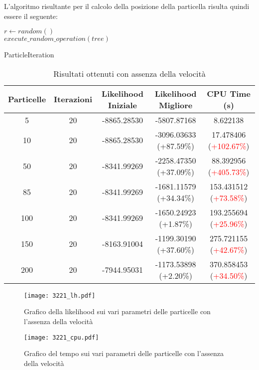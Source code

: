 L'algoritmo risultante per il calcolo della posizione della particella risulta quindi essere il seguente:

\begin{algorithm}[H]
    $r \gets random()$ \\
    $execute\_random\_operation(tree)$
    \caption{ParticleIteration}
    \label{algo:pso-adapt-calculate-1}
\end{algorithm}
\begin{table}[!h]
  \centering
  \begin{tabular}{*{5}{c}}
    Particelle & Iterazioni & Likelihood Iniziale & Likelihood Migliore & CPU Time (s) \\ \midrule \midrule
    5 & 20 & -8865.28530 & -5807.87168 & 8.622138 \\
    10 & 20 & -8865.28530 & -3096.03633 (\textcolor{ao(english)}{+87.59\%}) & 17.478406 (\textcolor{red}{+102.67\%})\\
    50 & 20 & -8341.99269 & -2258.47350 (\textcolor{ao(english)}{+37.09\%}) & 88.392956 (\textcolor{red}{+405.73\%}) \\
    85 & 20 & -8341.99269 & -1681.11579 (\textcolor{ao(english)}{+34.34\%}) & 153.431512 (\textcolor{red}{+73.58\%}) \\
    100 & 20 & -8341.99269 & -1650.24923 (\textcolor{ao(english)}{+1.87\%}) & 193.255694 (\textcolor{red}{+25.96\%}) \\
    150 & 20 & -8163.91004 & -1199.30190 (\textcolor{ao(english)}{+37.60\%}) & 275.721155 (\textcolor{red}{+42.67\%}) \\
    200 & 20 & -7944.95031 & -1173.53898 (\textcolor{ao(english)}{+2.20\%}) & 370.858453 (\textcolor{red}{+34.50\%})
  \end{tabular}
  \caption{Risultati ottenuti con assenza della velocità}
  \label{tab:pso-adapt-calculate-1-table}
\end{table}
\begin{figure}[!h]
  \centering
  \begin{minipage}{.45 \textwidth}
  \centering
  \texttt{[image: 3221\_lh.pdf]}
  \caption{Grafico della likelihood sui vari parametri delle particelle con l'assenza della velocità}
  \end{minipage}
  \begin{minipage}{.45 \textwidth}
    \centering
    \texttt{[image: 3221\_cpu.pdf]}
    \caption{Grafico del tempo sui vari parametri delle particelle con l'assenza della velocità}
  \end{minipage}
  \label{fig:pso-adapt-calculate-1-graph}
\end{figure}
